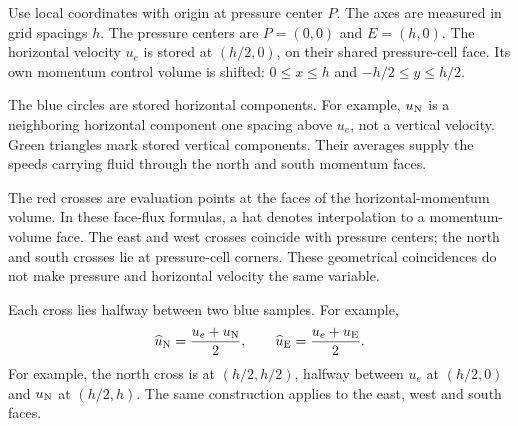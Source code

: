 \newpage
{}
Use local coordinates with origin at pressure center $P$. The axes are measured in grid spacings $h$. The pressure
centers are $P=(0,0)$ and $E=(h,0)$. The horizontal velocity $u_e$ is stored
at $(h/2,0)$, on their shared pressure-cell face. Its own momentum control
volume is shifted: $0\leq x\leq h$ and $-h/2\leq y\leq h/2$.

The blue circles are stored horizontal components. For example, $u_{\rm N}$ is
a neighboring horizontal component one spacing above $u_e$, not a vertical
velocity. Green triangles mark stored vertical components. Their averages
supply the speeds carrying fluid through the north and south momentum faces.

\newpage
{}
The red crosses are evaluation points at the faces of the horizontal-momentum
volume. In these face-flux formulas, a hat denotes
interpolation to a momentum-volume face. The east and west crosses coincide with pressure
centers; the north and south crosses lie at pressure-cell corners. These
geometrical coincidences do not make pressure and horizontal velocity the
same variable.

Each cross lies halfway between two blue samples. For example,
\[
\widehat u_{\rm N}=\frac{u_e+u_{\rm N}}2,\qquad
\widehat u_{\rm E}=\frac{u_e+u_{\rm E}}2.
\]
For example, the north cross is at $(h/2,h/2)$, halfway between
$u_e$ at $(h/2,0)$ and $u_{\rm N}$ at $(h/2,h)$. The same construction
applies to the east, west and south faces.

